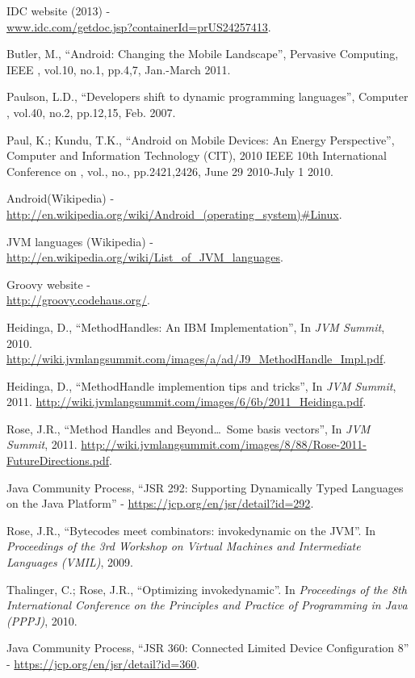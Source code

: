 \documentclass{sig-alternate}
\def \ANDROID{Android\xspace}
\def \JVM{JVM\xspace}
\begin{document}
\begin{thebibliography}{}

  IDC website (2013) - \\ \url{www.idc.com/getdoc.jsp?containerId=prUS24257413}.

  Butler, M., ``Android: Changing the Mobile Landscape'', Pervasive Computing, IEEE , vol.10, no.1, pp.4,7, Jan.-March 2011.

  Paulson, L.D., ``Developers shift to dynamic programming languages'', Computer , vol.40, no.2, pp.12,15, Feb. 2007.

  Paul, K.; Kundu, T.K., ``Android on Mobile Devices: An Energy Perspective'', Computer and Information Technology (CIT), 2010 IEEE 10th International Conference on , vol., no., pp.2421,2426, June 29 2010-July 1 2010.

  \ANDROID (Wikipedia) - \\ \url{http://en.wikipedia.org/wiki/Android\_(operating\_system)#Linux}.

  \JVM languages (Wikipedia) - \\ \url{http://en.wikipedia.org/wiki/List\_of\_JVM\_languages}.

  Groovy website - \\ \url{http://groovy.codehaus.org/}.
  
  Heidinga, D., ``MethodHandles: An IBM Implementation'', In {\it JVM Summit}, 2010. \url{http://wiki.jvmlangsummit.com/images/a/ad/J9_MethodHandle_Impl.pdf}.

  Heidinga, D., ``MethodHandle implemention tips and tricks'', In {\it JVM Summit}, 2011. \url{http://wiki.jvmlangsummit.com/images/6/6b/2011_Heidinga.pdf}.

  Rose, J.R., ``Method Handles and Beyond\dots~Some basis vectors'', In {\it JVM Summit}, 2011. \url{http://wiki.jvmlangsummit.com/images/8/88/Rose-2011-FutureDirections.pdf}.

  Java Community Process, ``JSR 292: Supporting Dynamically Typed Languages on the Java{\scriptsize\texttrademark} Platform'' - \url{https://jcp.org/en/jsr/detail?id=292}.

  Rose, J.R., ``Bytecodes meet combinators: invokedynamic on the JVM''. In {\it Proceedings of the 3rd Workshop on Virtual Machines and Intermediate Languages (VMIL)}, 2009.

  Thalinger, C.; Rose, J.R., ``Optimizing invokedynamic''. In {\it Proceedings of the 8th International Conference on the Principles and Practice of Programming in Java (PPPJ)}, 2010.

  Java Community Process, ``JSR 360: Connected Limited Device Configuration 8'' - \url{https://jcp.org/en/jsr/detail?id=360}.

\end{thebibliography}
\end{document}
